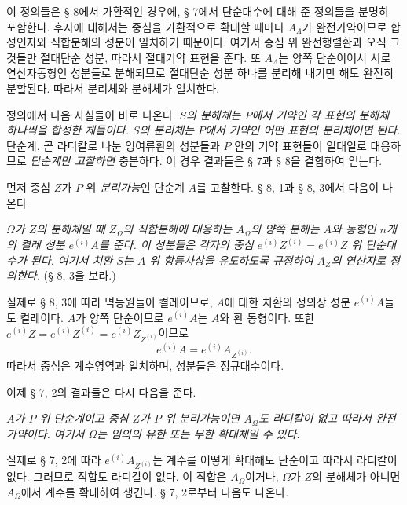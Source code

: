 이 정의들은 § 8에서 가환적인 경우에, § 7에서 단순대수에 대해 준 정의들을 분명히 포함한다. 후자에 대해서는 중심을 가환적으로 확대할 때마다 \(A_\Lambda\)가 완전가약이므로 합성인자와 직합분해의 성분이 일치하기 때문이다. 여기서 중심 위 완전행렬환과 오직 그것들만 절대단순 성분, 따라서 절대기약 표현을 준다. 또 \(A_\Lambda\)는 양쪽 단순이어서 서로 연산자동형인 성분들로 분해되므로 절대단순 성분 하나를 분리해 내기만 해도 완전히 분할된다. 따라서 분리체와 분해체가 일치한다.

정의에서 다음 사실들이 바로 나온다. \emph{\(S\)의 분해체는 \(P\)에서 기약인 각 표현의 분해체 하나씩을 합성한 체들이다. \(S\)의 분리체는 \(P\)에서 기약인 어떤 표현의 분리체이면 된다.} 단순계, 곧 라디칼로 나눈 잉여류환의 성분들과 \(P\) 안의 기약 표현들이 일대일로 대응하므로 \emph{단순계만 고찰하면} 충분하다. 이 경우 결과들은 § 7과 § 8을 결합하여 얻는다.

\noindent\textbf{} 먼저 중심 \(Z\)가 \(P\) 위 \emph{분리가능}인 단순계 \(A\)를 고찰한다. § 8, 1과 § 8, 3에서 다음이 나온다.

\emph{\(\Omega\)가 \(Z\)의 분해체일 때 \(Z_\Omega\)의 직합분해에 대응하는 \(A_\Omega\)의 양쪽 분해는 \(A\)와 동형인 \(n\)개의 켤레 성분 \(e^{(i)}A\)를 준다. 이 성분들은 각자의 중심 \(e^{(i)}Z^{(i)}=e^{(i)}Z\) 위 단순대수가 된다. 여기서 치환 \(S\)는 \(A\) 위 항등사상을 유도하도록 규정하여 \(A_Z\)의 연산자로 정의한다.} (§ 8, 3을 보라.)

실제로 § 8, 3에 따라 멱등원들이 켤레이므로, \(A\)에 대한 치환의 정의상 성분 \(e^{(i)}A\)들도 켤레이다. \(A\)가 양쪽 단순이므로 \(e^{(i)}A\)는 \(A\)와 환 동형이다. 또한 \(e^{(i)}Z=e^{(i)}Z^{(i)}=e^{(i)}Z_{Z^{(i)}}\)이므로
\[
e^{(i)}A=e^{(i)}A_{Z^{(i)}}.
\]
따라서 중심은 계수영역과 일치하며, 성분들은 정규대수이다.

이제 § 7, 2의 결과들은 다시 다음을 준다.

\emph{\(A\)가 \(P\) 위 단순계이고 중심 \(Z\)가 \(P\) 위 분리가능이면 \(A_\Omega\)도 라디칼이 없고 따라서 완전가약이다. 여기서 \(\Omega\)는 임의의 유한 또는 무한 확대체일 수 있다.}

실제로 § 7, 2에 따라 \(e^{(i)}A_{Z^{(i)}}\)는 계수를 어떻게 확대해도 단순이고 따라서 라디칼이 없다. 그러므로 직합도 라디칼이 없다. 이 직합은 \(A_\Omega\)이거나, \(\Omega\)가 \(Z\)의 분해체가 아니면 \(A_\Omega\)에서 계수를 확대하여 생긴다. § 7, 2로부터 다음도 나온다.

\begin{center}
\textbf{}
\end{center}

